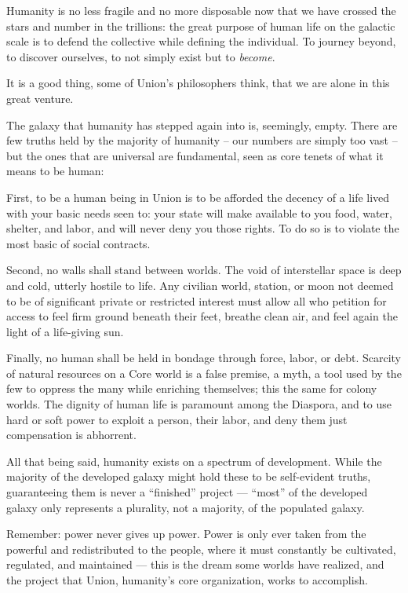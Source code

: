 Humanity is no less fragile and no more disposable now that we have crossed the stars and
number in the trillions: the great purpose of human life on the galactic scale is to defend the
collective while defining the individual. To journey beyond, to discover ourselves, to not simply
exist but to \textit{become}.


It is a good thing, some of Union’s philosophers think, that we are alone in this great venture.


The galaxy that humanity has stepped again into is, seemingly, empty. There are few truths held
by the majority of humanity -- our numbers are simply too vast -- but the ones that are universal
are fundamental, seen as core tenets of what it means to be human:


First, to be a human being in Union is to be afforded the decency of a life lived with your basic
needs seen to: your state will make available to you food, water, shelter, and labor, and will never
deny you those rights. To do so is to violate the most basic of social contracts.


Second, no walls shall stand between worlds. The void of interstellar space is deep and cold,
utterly hostile to life. Any civilian world, station, or moon not deemed to be of significant private
or restricted interest must allow all who petition for access to feel firm ground beneath their feet,
breathe clean air, and feel again the light of a life-giving sun.


Finally, no human shall be held in bondage through force, labor, or debt. Scarcity of natural
resources on a Core world is a false premise, a myth, a tool used by the few to oppress the many
while enriching themselves; this the same for colony worlds. The dignity of human life is
paramount among the Diaspora, and to use hard or soft power to exploit a person, their labor,
and deny them just compensation is abhorrent.


All that being said, humanity exists on a spectrum of development. While the majority of the
developed galaxy might hold these to be self-evident truths, guaranteeing them is never a
``finished'' project — ``most'' of the developed galaxy only represents a plurality, not a majority, of
the populated galaxy.


Remember: power never gives up power. Power is only ever taken from the powerful and
redistributed to the people, where it must constantly be cultivated, regulated, and maintained —
this is the dream some worlds have realized, and the project that Union, humanity’s core
organization, works to accomplish.


